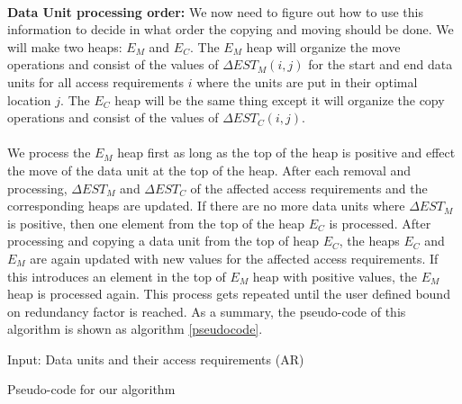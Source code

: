 \\
{\bf Data Unit processing order:} We now need to figure out how to use this
information to decide in what order the copying and moving should be done. We will make two heaps: $E_M$ and $E_C$. The $E_M$ heap will organize the move operations and consist of the values of $\Delta EST_M(i,j)$ for the start and end data units for all access requirements $i$ where the units are put in their optimal location $j$. The $E_C$ heap will be the same thing except it will organize the copy operations and consist of the values of $\Delta EST_C(i,j)$.\\
\\
We process the $E_M$ heap first as long as the top of the heap is positive and
effect the move of the data unit at the top of the heap. After each removal and
processing, $\Delta EST_M$ and $\Delta EST_C$ of the affected access
requirements and the corresponding heaps are updated. If there are no more data
units where $\Delta EST_M$ is positive, then one element from the top of the
heap $E_C$ is processed. After processing and copying a data unit from the top
of heap $E_C$, the heaps $E_C$ and $E_M$ are again updated with new values for
the affected access requirements. If this introduces an element in the top of
$E_M$ heap with positive values, the $E_M$ heap is processed again. This
process gets repeated until the user defined bound on redundancy factor is
reached. As a summary, the pseudo-code of this algorithm is shown as algorithm
\ref{pseudocode}.

\begin{algorithm}[t]
Input: Data units and their access requirements (AR) \;
\caption{Pseudo-code for our algorithm}
\label{pseudocode}
\end{algorithm}

